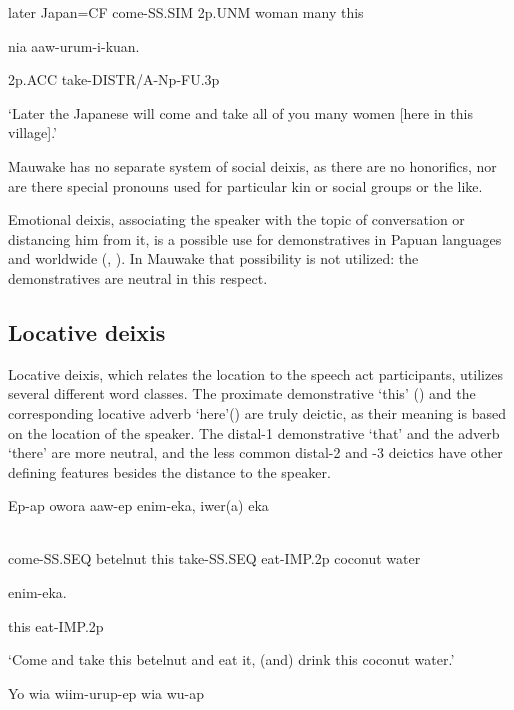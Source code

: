 later  Japan=CF  come-SS.SIM  2p.UNM  woman  many  this

nia  aaw-urum-i-kuan.

2p.ACC  take-DISTR/A-Np-FU.3p

`Later the Japanese will come and take all of you many women [here in this village].'

Mauwake has no separate system of social deixis, as there are no honorifics, nor are there special pronouns used for particular kin or social groups or the like.

Emotional deixis, associating the speaker with the topic of conversation or distancing him from it, is a possible use for demonstratives in Papuan languages and worldwide (\citealt[72-78]{FarrEtAl1982}, \citealt[347-355]{Lakoff1974}). In Mauwake that possibility is not utilized: the demonstratives are neutral in this respect.

\subsection{Locative deixis} 
\hypertarget{RefHeading22521935131865}{}
Locative deixis, which relates the location to the speech act participants, utilizes several different word classes. The proximate demonstrative  `this' () and the corresponding locative adverb  `here'()  are truly deictic, as their meaning is based on the location of the speaker. The distal-1 demonstrative  `that' and the adverb  `there' are more neutral, and the less common distal-2 and -3 deictics have other defining features besides the distance to the speaker. 

\ea%
\label{ex:x1273}
\gll Ep-ap  owora    aaw-ep  enim-eka,  iwer(a)  eka  \\
      \\
\glt
\z

come-SS.SEQ  betelnut  this  take-SS.SEQ  eat-IMP.2p  coconut  water

  enim-eka.

this  eat-IMP.2p

`Come and take this betelnut and eat it, (and) drink this coconut water.'

\ea%
\label{ex:x1274}
\gll Yo  wia  wiim-urup-ep    wia  wu-ap  \\
      \\
\glt
\z

